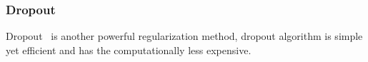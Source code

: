 \subsubsection{Dropout}

Dropout~\cite{JMLR:v15:srivastava14a} is another powerful regularization method, dropout algorithm is simple yet efficient and has the   computationally less expensive. 